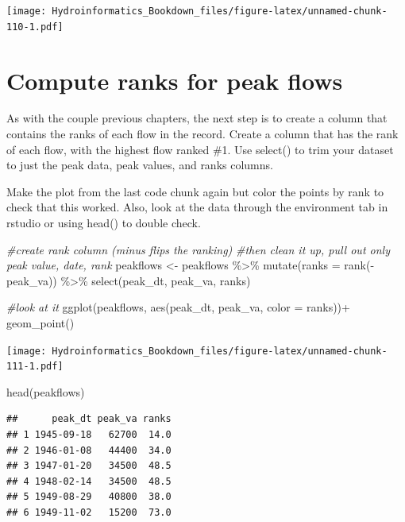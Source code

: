 \documentclass[
]{book}
\newenvironment{Shaded}{\begin{snugshade}}{\end{snugshade}}
\newcommand{\AttributeTok}[1]{\textcolor[rgb]{0.77,0.63,0.00}{#1}}
\newcommand{\CommentTok}[1]{\textcolor[rgb]{0.56,0.35,0.01}{\textit{#1}}}
\newcommand{\FunctionTok}[1]{\textcolor[rgb]{0.00,0.00,0.00}{#1}}
\newcommand{\NormalTok}[1]{#1}
\newcommand{\OtherTok}[1]{\textcolor[rgb]{0.56,0.35,0.01}{#1}}
\newcommand{\SpecialCharTok}[1]{\textcolor[rgb]{0.00,0.00,0.00}{#1}}
\begin{document}
\texttt{[image: Hydroinformatics\_Bookdown\_files/figure-latex/unnamed-chunk-110-1.pdf]}

\hypertarget{compute-ranks-for-peak-flows}{%
\section{Compute ranks for peak flows}\label{compute-ranks-for-peak-flows}}

As with the couple previous chapters, the next step is to create a column that contains the ranks of each flow in the record. Create a column that has the rank of each flow, with the highest flow ranked \#1. Use select() to trim your dataset to just the peak data, peak values, and ranks columns.

Make the plot from the last code chunk again but color the points by rank to check that this worked.
Also, look at the data through the environment tab in rstudio or using head() to double check.

\begin{Shaded}
\begin{Highlighting}[]
\CommentTok{\#create rank column (minus flips the ranking)}
\CommentTok{\#then clean it up, pull out only peak value, date, rank}
\NormalTok{peakflows }\OtherTok{\textless{}{-}}\NormalTok{ peakflows }\SpecialCharTok{\%\textgreater{}\%} \FunctionTok{mutate}\NormalTok{(}\AttributeTok{ranks =} \FunctionTok{rank}\NormalTok{(}\SpecialCharTok{{-}}\NormalTok{peak\_va)) }\SpecialCharTok{\%\textgreater{}\%}
              \FunctionTok{select}\NormalTok{(peak\_dt, peak\_va, ranks)}

\CommentTok{\#look at it}
\FunctionTok{ggplot}\NormalTok{(peakflows, }\FunctionTok{aes}\NormalTok{(peak\_dt, peak\_va, }\AttributeTok{color =}\NormalTok{ ranks))}\SpecialCharTok{+}
  \FunctionTok{geom\_point}\NormalTok{()}
\end{Highlighting}
\end{Shaded}

\texttt{[image: Hydroinformatics\_Bookdown\_files/figure-latex/unnamed-chunk-111-1.pdf]}

\begin{Shaded}
\begin{Highlighting}[]
\FunctionTok{head}\NormalTok{(peakflows)}
\end{Highlighting}
\end{Shaded}

\begin{verbatim}
##      peak_dt peak_va ranks
## 1 1945-09-18   62700  14.0
## 2 1946-01-08   44400  34.0
## 3 1947-01-20   34500  48.5
## 4 1948-02-14   34500  48.5
## 5 1949-08-29   40800  38.0
## 6 1949-11-02   15200  73.0
\end{verbatim}
\end{document}
